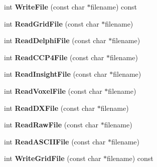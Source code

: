 \begin{DoxyCompactItemize}
\item 
int {\bfseries Write\+File} (const char $\ast$filename) const \hypertarget{class_r3_grid_a59eda54a1daa61f1bdd4ec52258c0012}{}\label{class_r3_grid_a59eda54a1daa61f1bdd4ec52258c0012}

\item 
int {\bfseries Read\+Grid\+File} (const char $\ast$filename)\hypertarget{class_r3_grid_affb3cf4d8c54554137b6fae79b8bc37f}{}\label{class_r3_grid_affb3cf4d8c54554137b6fae79b8bc37f}

\item 
int {\bfseries Read\+Delphi\+File} (const char $\ast$filename)\hypertarget{class_r3_grid_aaed24b36e0b40b25dd2fd2ce02c8d542}{}\label{class_r3_grid_aaed24b36e0b40b25dd2fd2ce02c8d542}

\item 
int {\bfseries Read\+C\+C\+P4\+File} (const char $\ast$filename)\hypertarget{class_r3_grid_aaf354794ddadb25a97d7c5cd01661227}{}\label{class_r3_grid_aaf354794ddadb25a97d7c5cd01661227}

\item 
int {\bfseries Read\+Insight\+File} (const char $\ast$filename)\hypertarget{class_r3_grid_aa1574b71724ef6917db4e71cf410edf4}{}\label{class_r3_grid_aa1574b71724ef6917db4e71cf410edf4}

\item 
int {\bfseries Read\+Voxel\+File} (const char $\ast$filename)\hypertarget{class_r3_grid_a980d49531660b7cbd163033d813d0ae6}{}\label{class_r3_grid_a980d49531660b7cbd163033d813d0ae6}

\item 
int {\bfseries Read\+D\+X\+File} (const char $\ast$filename)\hypertarget{class_r3_grid_a9c6ccba9d4c2c4e120c9a6480b14a421}{}\label{class_r3_grid_a9c6ccba9d4c2c4e120c9a6480b14a421}

\item 
int {\bfseries Read\+Raw\+File} (const char $\ast$filename)\hypertarget{class_r3_grid_a4160c55578071b711ce54427d7bc6950}{}\label{class_r3_grid_a4160c55578071b711ce54427d7bc6950}

\item 
int {\bfseries Read\+A\+S\+C\+I\+I\+File} (const char $\ast$filename)\hypertarget{class_r3_grid_a092d02b0b5d4be694a8244f6266804be}{}\label{class_r3_grid_a092d02b0b5d4be694a8244f6266804be}

\item 
int {\bfseries Write\+Grid\+File} (const char $\ast$filename) const \hypertarget{class_r3_grid_a8e9fa4402804ef517cbf56a4226921bd}{}\label{class_r3_grid_a8e9fa4402804ef517cbf56a4226921bd}


\end{DoxyCompactItemize}
